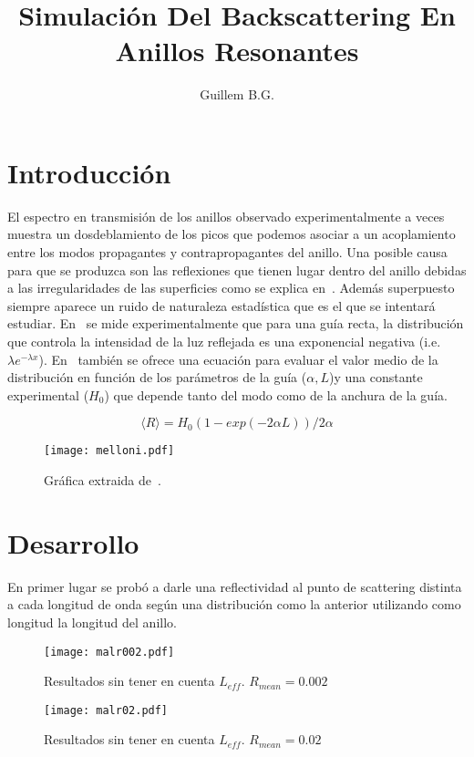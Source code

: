 \documentclass[oneside]{article}
\title{Simulación Del Backscattering En Anillos Resonantes}
\author{Guillem B.G.}
\begin{document}
\maketitle
\newpage
\section{Introducción}
El espectro en transmisión de los anillos observado experimentalmente a veces
muestra un dosdeblamiento de los picos que podemos asociar a un acoplamiento
entre los modos propagantes y contrapropagantes del anillo. Una posible causa
para que se produzca son las reflexiones que tienen lugar dentro del anillo
debidas a las irregularidades de las superficies como se explica en~\cite{surface-roughness}.
Además superpuesto siempre aparece un ruido de naturaleza estadística que es
el que se intentará estudiar. En~\cite{statistics} se mide experimentalmente que para una guía
recta, la distribución que controla la intensidad de la luz reflejada es una
exponencial negativa (i.e. $\lambda e^{-\lambda x}$). En~\cite{statistics} también se ofrece
una ecuación para evaluar el valor medio de la distribución en función de los
parámetros de la guía ($\alpha, L$)y una constante experimental ($H_0$) que 
depende tanto del modo como de la anchura de la guía.

\begin{equation}
   \langle R \rangle = H_0 (1-exp(-2\alpha L))/2\alpha
\end{equation}

\begin{figure}[!h]
    \centering
    \texttt{[image: melloni.pdf]}
    \caption{Gráfica extraida de~\cite{statistics}.}
\end{figure}

\section{Desarrollo}
En primer lugar se probó a darle una reflectividad al punto de scattering
distinta a cada longitud de onda según una distribución como la anterior
utilizando como longitud la longitud del anillo.

\begin{figure}[h]
    \centering
    \texttt{[image: malr002.pdf]}
    \caption{Resultados sin tener en cuenta $L_{eff}$. $R_{mean} = 0.002$}
    \label{mal1}
\end{figure}

\begin{figure}[h]
    \centering
    \texttt{[image: malr02.pdf]}
    \caption{Resultados sin tener en cuenta $L_{eff}$. $R_{mean} = 0.02$}
    \label{mal2}
\end{figure}
\end{document}
